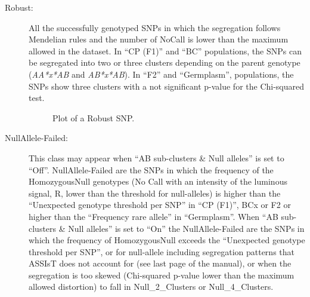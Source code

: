 \documentclass[a4paper,11pt,english]{article}
\begin{document}
\begin{description}
 \item [Robust:] All the successfully genotyped SNPs in which the segregation follows
Mendelian rules and the number of NoCall is lower
than the maximum allowed in the dataset. In ``CP (F1)'' and ``BC'' populations, the SNPs can be 
segregated into two or three clusters depending on the parent genotype (\emph{AA*x*AB} and
\emph{AB*x*AB}). In ``F2'' and ``Germplasm'', populations, the SNPs
show three clusters with a not significant p-value for the Chi-squared test.

\begin{figure}[H]
\centering
\capstart

\caption{Plot of a Robust SNP.}\end{figure}

\item [NullAllele-Failed:] This class may appear when ``AB sub-clusters \& Null alleles''  is set
to ``Off''.  NullAllele-Failed are the SNPs in which the frequency of the
HomozygousNull genotypes (No Call with an intensity of the luminous signal, R,
lower than the threshold for null-alleles) is higher than the ``Unexpected genotype threshold per
SNP'' in ``CP (F1)'', BCx or F2 or higher than the ``Frequency rare allele'' in ``Germplasm''. 
When ``AB sub-clusters \& Null alleles'' is set to ``On'' the NullAllele-Failed are the SNPs in
which the frequency of HomozygousNull  exceeds the ``Unexpected genotype threshold per
SNP'', or for null-allele including segregation patterns that ASSIsT does not account for (see
last page of the manual), or when the segregation is too skewed (Chi-squared p-value lower than the
maximum allowed distortion) to fall in Null\_2\_Clusters or
Null\_4\_Clusters.
\begin{figure}[H]
\centering
\capstart


\end{figure}
\end{description}
\end{document}
